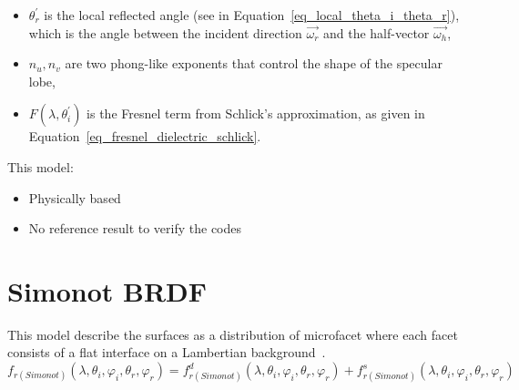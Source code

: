 \begin{itemize}
    \item $\theta_r^\prime$ is the local reflected angle (see in Equation~\eqref{eq_local_theta_i_theta_r}), which is the angle between the incident direction $\overrightarrow{\omega_r}$ and the half-vector $\overrightarrow{\omega_h}$,

    \item $n_u, n_v$ are two phong-like exponents that control the shape of the specular lobe,

    \item $F(\lambda, \theta_i^\prime)$ is the Fresnel term from Schlick's approximation, as given in Equation~\eqref{eq_fresnel_dielectric_schlick}.

\end{itemize}

This model:
\begin{itemize}
    \item Physically based
    \item No reference result to verify the codes
\end{itemize}


\section{Simonot  BRDF}
This model describe the surfaces as a distribution of microfacet where each facet consists of a flat interface on a Lambertian background~\cite{2009_Simonot}.
\begin{equation}
    \label{eq_Simonot}
    f_{r(Simonot)}(\lambda, \theta_i, \varphi_i, \theta_r, \varphi_r) = f_{r(Simonot)}^{d}(\lambda, \theta_i, \varphi_i, \theta_r, \varphi_r) + f_{r(Simonot)}^{s}(\lambda, \theta_i, \varphi_i, \theta_r, \varphi_r)
\end{equation}

